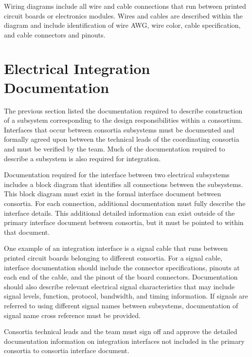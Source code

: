 Wiring diagrams include all wire and cable connections that
run between printed circuit boards or electronics modules.  Wires and
cables are described within the diagram and
include identification of wire AWG, wire color, cable specification,
and cable connectors and pinouts. 




\section{Electrical Integration Documentation}
\label{sec:fdsp-coord-integ-electrical}
The previous section  listed the documentation required to describe construction of a subsystem corresponding to the design
responsibilities within a consortium.  Interfaces that occur between
consortia subsystems must be documented and formally agreed upon
between the technical leads of the coordinating consortia and must be
verified by the  team.  Much of the
documentation required to describe a subsystem is also required for integration.


Documentation required for the interface between two electrical
subsystems includes a block diagram that identifies all connections
between the subsystems.  This block diagram must exist in the formal
interface document between consortia.  For each connection, additional
documentation must fully describe the interface
details. This additional detailed information can exist outside of the
primary interface document between consortia, but it must be pointed
to within that document.


One example of an integration interface is a signal cable that runs
between printed circuit boards belonging to different consortia.  For
a signal cable, interface documentation should include the connector
specifications, pinouts at each end of the cable, and the pinout of the
board connectors.  Documentation should also describe
relevant electrical signal characteristics that may include signal
levels, function, protocol, bandwidth, and timing information.  If
signals are referred to using different signal names between
subsystems, documentation of signal name cross reference must be
provided.


Consortia technical leads and the  team must sign off
and approve the detailed documentation information on integration
interfaces not included in the primary consortia to consortia
interface document.





